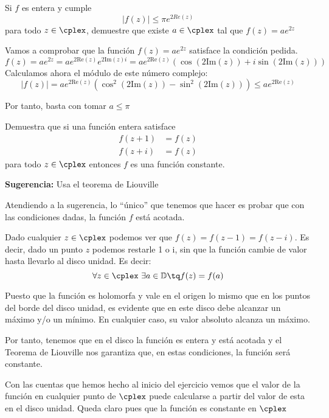 \begin{problem}[11]
Si $f$ es entera y cumple
\[|f(z)| \leq πe^{2Re(z)}\]
para todo $z \in \cplex$, demuestre que existe $a\in \cplex$ tal que $f(z)=ae^{2z}$
\solution
{}

Vamos a comprobar que la función $f(z)=ae^{2z}$ satisface la condición pedida.
\[f(z)=ae^{2z} = ae^{2\text{Re}(z)}e^{2\text{Im}(z)i}=ae^{2\text{Re}(z)}(\cos(2\text{Im}(z))+i\sin(2\text{Im}(z)))\]
Calculamos ahora el módulo de este número complejo:
\[|f(z)|=ae^{2\text{Re}(z)}\left(\cos^2(2\text{Im}(z))-\sin^2(2\text{Im}(z))\right)\leq ae^{2\text{Re}(z)}\]

Por tanto, basta con tomar $a\leq π$
\end{problem}

\begin{problem}[12]
Demuestra que si una función entera satisface
\[\begin{aligned}
f(z+1) &= f(z)\\
f(z+i) &= f(z)
\end{aligned}\]
para todo $z \in \cplex$ entonces $f$ es una función constante.

\textbf{Sugerencia:} Usa el teorema de Liouville
\solution


Atendiendo a la sugerencia, lo ``único'' que tenemos que hacer es probar que con las condiciones dadas, la función $f$ está acotada.

Dado cualquier $z \in \cplex$ podemos ver que $f(z)=f(z-1)=f(z-i)$. Es decir, dado un punto $z$ podemos restarle 1 o i, sin que la función cambie de valor hasta llevarlo al disco unidad. Es decir:
\[\forall z \in \cplex \ \exists a \in \mathbb{D} \tq f(z)=f(a)\]

Puesto que la función es holomorfa y vale en el origen lo mismo que en los puntos del borde del disco unidad, es evidente que en este disco debe alcanzar un máximo y/o un mínimo. En cualquier caso, su valor absoluto alcanza un máximo.

Por tanto, tenemos que en el disco la función es entera y está acotada y el Teorema de Liouville nos garantiza que, en estas condiciones, la función será constante.

Con las cuentas que hemos hecho al inicio del ejercicio vemos que el valor de la función en cualquier punto de $\cplex$ puede calcularse a partir del valor de esta en el disco unidad. Queda claro pues que la función es constante en $\cplex$

\end{problem}

